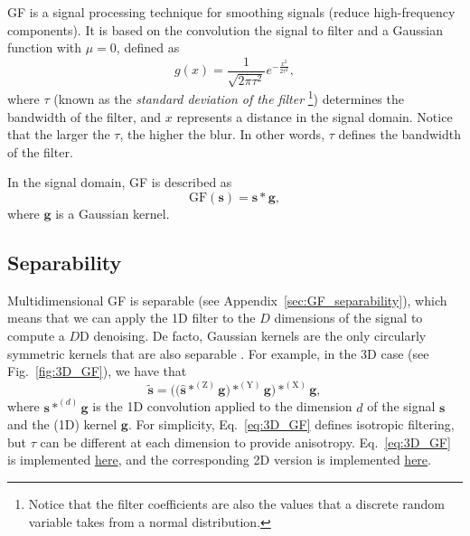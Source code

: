 \chapter{}

\acrshort{GF} is a signal processing technique for smoothing signals
(reduce high-frequency components). It is based on the convolution the
signal to filter and a Gaussian function with $\mu=0$, defined as
\begin{equation}
  g(x) = \frac{1}{\sqrt{2\pi\tau^2}}e^{-\frac{{x}^2}{2\tau^2}},
  \label{eq:GK}
\end{equation}
where $\tau$ (known as the \emph{standard deviation of the filter}
\footnote{Notice that the filter coefficients are also the values that
  a discrete random variable takes from a normal distribution.})
determines the bandwidth of the filter, and $x$ represents a distance
in the signal domain. Notice that the larger the $\tau$, the higher
the blur. In other words, $\tau$ defines the bandwidth of the filter.

In the signal domain, \gls{GF} is described as
\begin{equation}
  \text{GF}(\mathbf{s}) = \mathbf{s}\ast\mathbf{g},
\end{equation}
where $\mathbf{g}$ is a Gaussian kernel.

\section{Separability}
Multidimensional \gls{GF} is separable (see
Appendix~\ref{sec:GF_separability}), which means that we can apply the
1D filter to the $D$ dimensions of the signal to compute a $D$D
denoising. De facto, Gaussian kernels are the only circularly
symmetric kernels that are also separable
\cite{gonzalez1992digital}. For example, in the 3D case (see
Fig.~\ref{fig:3D_GF}), we have that
\begin{equation}
  \tilde{\mathbf{s}} = \Big(\big(\hat{\mathbf s}*^{(\text{Z})}{\mathbf g}\big)*^{(\text{Y})}{\mathbf g}\Big)*^{(\text{X})}{\mathbf g},
    \label{eq:3D_GF}
\end{equation}
where ${\mathbf s}*^{(d)}{\mathbf g}$ is the 1D convolution applied to
the dimension $d$ of the signal ${\mathbf s}$ and the (1D) kernel
${\mathbf g}$. For simplicity, Eq.~\ref{eq:3D_GF} defines isotropic
filtering, but $\tau$ can be different at each dimension to provide
anisotropy. Eq.~\ref{eq:3D_GF} is implemented
\href{https://github.com/vicente-gonzalez-ruiz/denoising/blob/main/src/denoising/volume/gaussian.py}{here},
and the corresponding 2D version is implemented
\href{https://github.com/vicente-gonzalez-ruiz/denoising/blob/main/src/denoising/image/gaussian.py}{here}.

